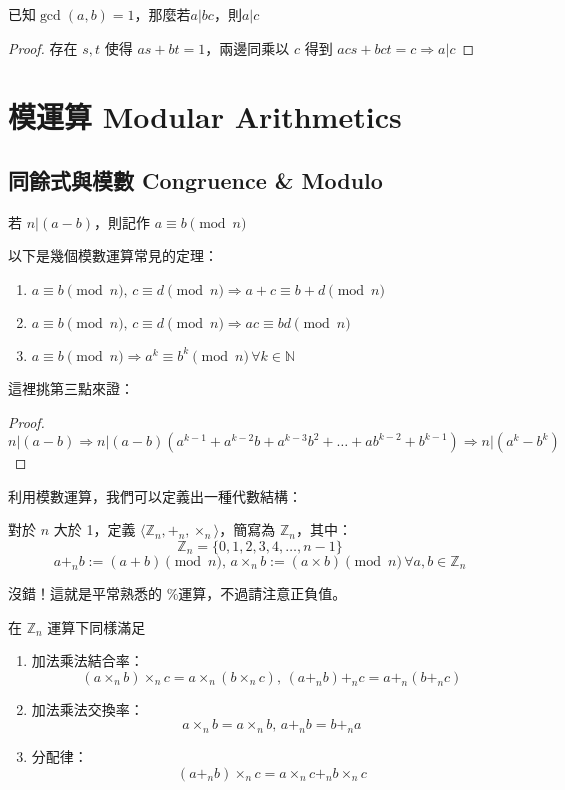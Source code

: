 \begin{lemma}[歐幾里德引理]
\label{EuclidsLemma}
已知$\gcd(a,b)=1$，那麼若$a|bc$，則$a|c$
\end{lemma}
\begin{proof}
存在 $s,t$ 使得 $as+bt=1$，兩邊同乘以 $c$ 得到 $acs+bct=c\Rightarrow a|c$
\end{proof}


\section{模運算 Modular Arithmetics}
\label{sec:mod}

\subsection{同餘式與模數 Congruence \& Modulo}
\label{sec:mod:mod}

\begin{definition}
若 $n|(a-b)$，則記作 $a\equiv b \pmod n$
\end{definition}
\begin{theorem}
以下是幾個模數運算常見的定理：
\begin{enumerate}
\item $a\equiv b \pmod n,\,c\equiv d \pmod n\Rightarrow a+c \equiv b+d \pmod n$
\item $a\equiv b \pmod n,\,c\equiv d \pmod n\Rightarrow ac \equiv bd \pmod n$
\item $a\equiv b \pmod n\Rightarrow a^k \equiv b^k \pmod n\,\forall k \in\mathbb{N}$
\end{enumerate}
\end{theorem}

這裡挑第三點來證：
\begin{proof}
$$n|(a-b)
\Rightarrow n|(a-b)(a^{k-1}+a^{k-2}b+a^{k-3}b^2+\ldots+ab^{k-2}+b^{k-1})
\Rightarrow n|(a^k-b^k)$$
\end{proof}

利用模數運算，我們可以定義出一種代數結構：
\begin{definition}
對於 $n$ 大於 1，定義 $\langle\mathbb{Z}_n,+_n,\times_n\rangle$，簡寫為 $\mathbb Z_n$，其中：
$$\mathbb Z_n=\{0,1,2,3,4,\ldots,n-1\}$$
$$a+_nb:=(a+b)\pmod n,\,a\times_n b:=(a\times b)\pmod n\,\forall a,b\in\mathbb Z_n$$
\end{definition}

沒錯！這就是平常熟悉的 \%運算，不過請注意正負值。

\begin{theorem}
在 $\mathbb Z_n$ 運算下同樣滿足
\begin{enumerate}
\item 加法乘法結合率：$$(a\times_n b)\times_n c=a\times_n (b \times_n c),\,(a+_n b)+_n c=a+_n (b +_n c)$$
\item 加法乘法交換率：$$a\times_n b=a\times_n b,\,a+_n b=b+_n a$$
\item 分配律：$$(a+_n b)\times_n c=a\times_n c+_n b\times_n c$$
\end{enumerate}
\end{theorem}

